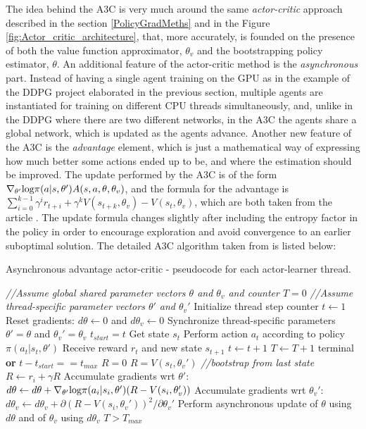 The idea behind the A3C is very much around the same \textit{actor-critic} approach described in the section \ref{PolicyGradMeths} and in the Figure \ref{fig:Actor_critic_architecture}, that, more accurately, is founded on the presence of both the value function approximator, $\theta_{v}$ and the bootstrapping policy estimator, $\theta$. An additional feature of the actor-critic method is the \textit{asynchronous} part. Instead of having a single agent training on the GPU as in the example of the DDPG project elaborated in the previous section, multiple agents are instantiated for training on different CPU threads simultaneously, and, unlike in the DDPG where there are two different networks, in the A3C the agents share a global network, which is updated as the agents advance. Another new feature of the A3C is the \textit{advantage} element, which is just a mathematical way of expressing how much better some actions ended up to be, and where the estimation should be improved. The update performed by the A3C is of the form $\nabla_{\theta'}\textup{log}\pi(a|s,\theta')A(s,a,\theta,\theta_{v})$, and the formula for the advantage is $\sum_{i=0}^{k-1}\gamma^{i}r_{t+i}+\gamma^kV(s_{t+k},\theta_{v})-V(s_{t},\theta_{v})$, which are both taken from the article \cite{DBLP:journals/corr/MnihBMGLHSK16}. The update formula changes slightly after including the entropy factor in the policy in order to encourage exploration and avoid convergence to an earlier suboptimal solution. The detailed A3C algorithm taken from \cite{DBLP:journals/corr/MnihBMGLHSK16} is listed below:
\begin{algorithm}[H]
	\caption{Asynchronous advantage actor-critic - pseudocode for each actor-learner thread.}
	\label{algo:A3C}
	\begin{algorithmic}
		\State \textit{//Assume global shared parameter vectors $\theta$ and $\theta_{v}$ and counter $T=0$}
		\State \textit{//Assume thread-specific parameter vectors $\theta'$ and $\theta_{v}'$}
		\State Initialize thread step counter $t\leftarrow1$
		\Repeat
		\State Reset gradients: $d\theta\leftarrow 0$ and $d\theta_{v}\leftarrow0$
		\State Synchronize thread-specific parameters $\theta'=\theta$ and $\theta_{v}'=\theta_{v}$
		\State $t_{start}=t$
		\State Get state $s_{t}$
		\Repeat
		\State Perform action $a_{t}$ according to policy $\pi(a_{t}|s_{t}, \theta')$
		\State Receive reward $r_{t}$ and new state $s_{t+1}$
		\State $t\leftarrow t+1$
		\State $T\leftarrow T+1$
		\Until terminal \textbf{or} $t-t_{start}==t_{max}$
		\State $R=0$
		\Else 
		\State $R=V(s_{t},\theta_{v}')$ \textit{//bootstrap from last state }
		\EndIf
		\State $R\leftarrow r_{i}+\gamma R$
		\State Accumulate gradients wrt $\theta'$:
		\State $d\theta\leftarrow d\theta+\nabla_{\theta'}\textup{log}\pi(a_{i}|s_{i},\theta')(R-V(s_{i},\theta_{v}'))$
		\State Accumulate gradients wrt $\theta_{v}'$:
		\State $d\theta_{v}\leftarrow d\theta_{v} + \partial (R-V(s_{i},\theta_{v}'))^2/ \partial\theta_{v}'$
		\EndFor
		\State Perform asynchronous update of $\theta$ using $d\theta$ and of $\theta_{v}$ using $d\theta_{v}$
		\Until $T>T_{max}$
	\end{algorithmic}
\end{algorithm}

